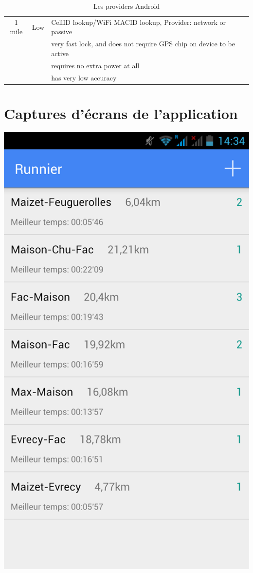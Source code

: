 \begin{appendices}
\begin{table}[H]
\begin{center}
\begin{tabular}{| c | c | l | }
    1 mile & Low & CellID lookup/WiFi MACID lookup, Provider: network or passive \\
     && very fast lock, and does not require GPS chip on device to be active \\
	 && requires no extra power at all \\ 
     && has very low accuracy \\
     \hline
   \end{tabular}   
 \end{center}
\caption{Les providers Android}
\end{table}
\chapter{Captures d'écrans de l'application}
\label{Annexe4}
\begin{multicols}{3}
\begin{img}
  \includegraphics[scale=0.3]{img/home.jpg}

\end{img}
\end{multicols}
\end{appendices}
